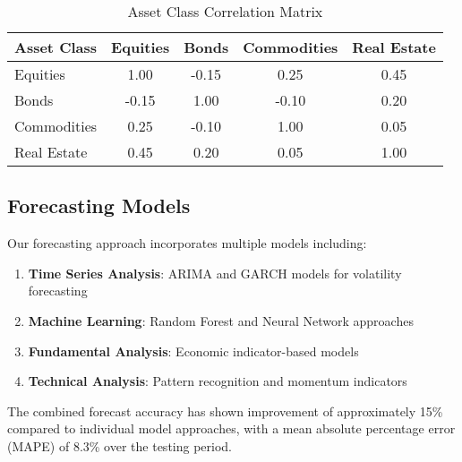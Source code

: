 \begin{table}[htbp]
\centering
\caption{Asset Class Correlation Matrix}
\label{tab:correlation}
\begin{tabular}{lcccc}
\toprule
\textbf{Asset Class} & \textbf{Equities} & \textbf{Bonds} & \textbf{Commodities} & \textbf{Real Estate} \\
\midrule
Equities & 1.00 & -0.15 & 0.25 & 0.45 \\
Bonds & -0.15 & 1.00 & -0.10 & 0.20 \\
Commodities & 0.25 & -0.10 & 1.00 & 0.05 \\
Real Estate & 0.45 & 0.20 & 0.05 & 1.00 \\
\bottomrule
\end{tabular}
\end{table}

\subsection{Forecasting Models}
Our forecasting approach incorporates multiple models including:

\begin{enumerate}
\item \textbf{Time Series Analysis}: ARIMA and GARCH models for volatility forecasting
\item \textbf{Machine Learning}: Random Forest and Neural Network approaches
\item \textbf{Fundamental Analysis}: Economic indicator-based models
\item \textbf{Technical Analysis}: Pattern recognition and momentum indicators
\end{enumerate}

The combined forecast accuracy has shown improvement of approximately 15\% compared to 
individual model approaches, with a mean absolute percentage error (MAPE) of 8.3\% 
over the testing period.
